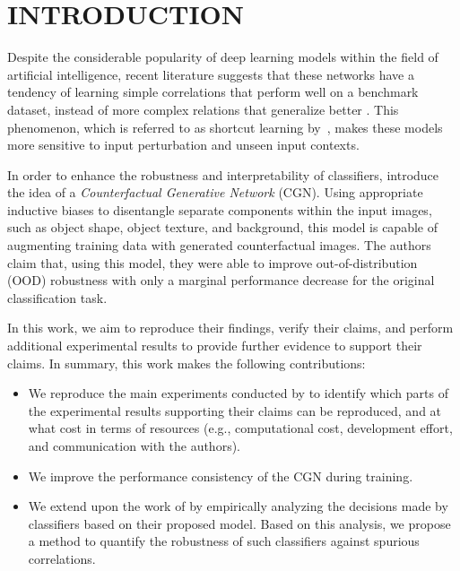 \section{INTRODUCTION}

Despite the considerable popularity of deep learning models within the field of artificial intelligence, recent literature suggests that these networks have a tendency of learning simple correlations that perform well on a benchmark dataset, instead of more complex relations that generalize better \cite{alcorn2019strike, ming2021impact, rosenfeld2018elephant}. This phenomenon, which is referred to as shortcut learning by~, makes these models more sensitive to input perturbation and unseen input contexts.

In order to enhance the robustness and interpretability of classifiers,  introduce the idea of a \emph{Counterfactual Generative Network} (CGN).
Using appropriate inductive biases to disentangle separate components within the input images, such as object shape, object texture, and background, this model is capable of augmenting training data with generated counterfactual images.
The authors claim that, using this model, they were able to improve out-of-distribution (OOD) robustness with only a marginal performance decrease for the original classification task.

In this work, we aim to reproduce their findings, verify their claims, and perform additional experimental results to provide further evidence to support their claims. In summary, this work makes the following contributions:
\begin{itemize}
    \item We reproduce the main experiments conducted by  to identify which parts of the experimental results supporting their claims can be reproduced, and at what cost in terms of resources (e.g., computational cost, development effort, and communication with the authors).
    \item We improve the performance consistency of the CGN during training.
    \item We extend upon the work of \citeauthor{Sauer2021ICLR} by empirically analyzing the decisions made by classifiers based on their proposed model. Based on this analysis, we propose a method to quantify the robustness of such classifiers against spurious correlations.
\end{itemize}

